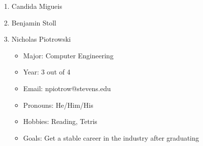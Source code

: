 \begin{enumerate}
    \item Candida Migueis
    \item Benjamin Stoll
    \item Nicholas Piotrowski
        \begin{itemize}
        \item Major: Computer Engineering
        \item Year: 3 out of 4
        \item Email: npiotrow@stevens.edu
        \item Pronouns: He/Him/His
        \item Hobbies: Reading, Tetris
        \item Goals: Get a stable career in the industry after graduating
        \end{itemize}
\end{enumerate}
